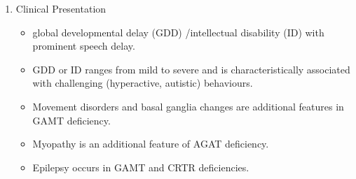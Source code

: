 \documentclass{scrartcl}
\begin{document}
\begin{enumerate}
\item Clinical Presentation
\label{sec:org8a66e46}
\begin{itemize}
\item global developmental delay (GDD) /intellectual disability (ID) with
prominent speech delay.
\item GDD or ID ranges from mild to severe and is characteristically
associated with challenging (hyperactive, autistic) behaviours.
\item Movement disorders and basal ganglia changes are additional features
in GAMT deficiency.
\item Myopathy is an additional feature of AGAT deficiency.
\item Epilepsy occurs in GAMT and CRTR deficiencies.
\end{itemize}


\end{enumerate}
\end{document}
